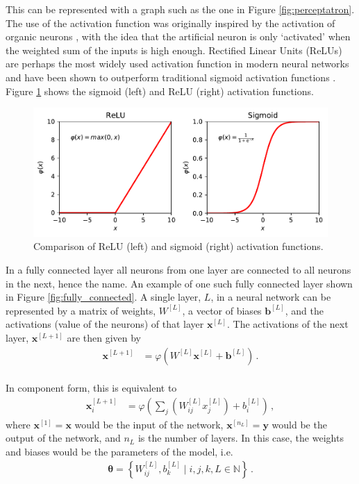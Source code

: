 \documentclass[11pt,a4paper,onecolumn]{report}
\begin{document}
This can be represented with a graph such as the one in Figure
\ref{fig:perceptatron}. The use of the activation function was originally
inspired by the activation of organic neurons \citep{hodgkin1952}, with the idea
that the artificial neuron is only `activated' when the weighted sum of the
inputs is high enough. Rectified Linear Units (ReLUs) are perhaps the most
widely used activation function in modern neural networks and have been shown to
outperform traditional sigmoid activation functions \citep{glorot2011}. Figure
\ref{fig:activation} shows the sigmoid (left) and ReLU (right) activation
functions.\\


\begin{figure}[t]
  \centering
  \includegraphics[width=\linewidth]{sigmoid_v_relu.pdf}
  \caption{Comparison of ReLU (left) and sigmoid (right) activation functions.}
  \label{fig:activation}
\end{figure}

In a fully connected layer all neurons from one layer are connected to all
neurons in the next, hence the name. An example of one such fully connected
layer shown in Figure \ref{fig:fully_connected}. A single layer, \(L\), in a
neural network can be represented by a matrix of weights, \(W^{[L]}\), a
vector of biases \(\bm{b}^{[L]}\), and the activations (value of the neurons) of
that layer \(\bm{x}^{[L]}\). The activations of the next layer,
\(\bm{x}^{[L+1]}\) are then given by
\begin{align}
  \label{eqn:matrix_repr}
  \bm{x}^{[L+1]} &= \varphi \left(W^{[L]}\bm{x}^{[L]} +\bm{b}^{[L]}\right)\,.
\end{align}
\\

\noindent In component form, this is equivalent to
\begin{align}
  \label{eqn:component_repr}
  \bm{x}^{[L+1]}_i
  &= \varphi \left(\sum\limits_j \left(W^{[L]}_{ij}x^{[L]}_j\right) + b^{[L]}_i\right)\,,
\end{align}
where \(\bm{x}^{[1]} = \bm{x}\) would be the input of the network,
\(\bm{x}^{[n_L]} = \bm{y}\) would be the output of the network, and \(n_L\) is
the number of layers. In this case, the weights and biases would be the
parameters of the model, i.e.
\begin{align*}
  \bm{\theta} = \left\{W_{ij}^{[L]}, b_{k}^{[L]} \mid i, j, k, L \in \mathbb{N} \right\}\,.
\end{align*}
\end{document}
